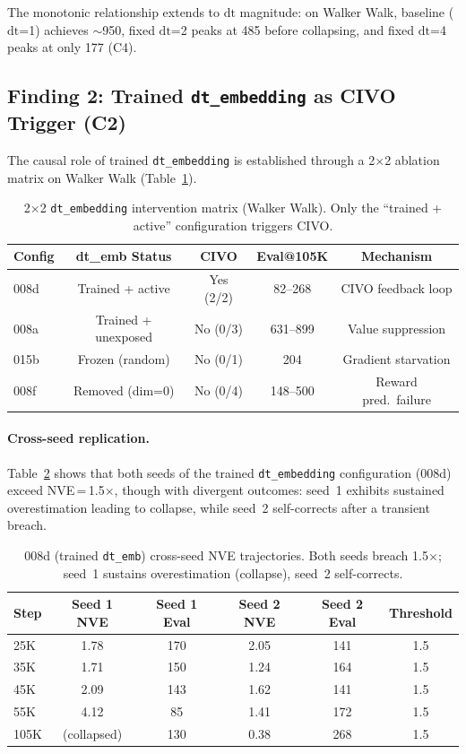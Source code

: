 \documentclass{article}
\newcommand{\dt}{\mathrm{dt}}
\begin{document}
The monotonic relationship extends to $\dt$ magnitude: on Walker Walk, baseline ($\dt$=1) achieves $\sim$950, fixed $\dt$=2 peaks at 485 before collapsing, and fixed $\dt$=4 peaks at only 177 (C4).

\subsection{Finding 2: Trained \texttt{dt\_embedding} as CIVO Trigger (C2)}
\label{sec:c2}

The causal role of trained \texttt{dt\_embedding} is established through a 2$\times$2 ablation matrix on Walker Walk (Table~\ref{tab:ablation-matrix}).

\begin{table}[h]
\centering
\caption{2$\times$2 \texttt{dt\_embedding} intervention matrix (Walker Walk).
Only the ``trained + active'' configuration triggers CIVO.}
\label{tab:ablation-matrix}
\begin{tabular}{lcccc}
\toprule
\textbf{Config} & \textbf{dt\_emb Status} & \textbf{CIVO} & \textbf{Eval@105K} & \textbf{Mechanism} \\
\midrule
008d & Trained + active & Yes (2/2) & 82--268 & CIVO feedback loop \\
008a & Trained + unexposed & No (0/3) & 631--899 & Value suppression \\
015b & Frozen (random) & No (0/1) & 204 & Gradient starvation \\
008f & Removed (dim=0) & No (0/4) & 148--500 & Reward pred.\ failure \\
\bottomrule
\end{tabular}
\end{table}

\paragraph{Cross-seed replication.}
Table~\ref{tab:008d-crossseed} shows that both seeds of the trained \texttt{dt\_embedding} configuration (008d) exceed NVE\,=\,1.5$\times$, though with divergent outcomes: seed~1 exhibits sustained overestimation leading to collapse, while seed~2 self-corrects after a transient breach.

\begin{table}[h]
\centering
\caption{008d (trained \texttt{dt\_emb}) cross-seed NVE trajectories.
Both seeds breach 1.5$\times$; seed~1 sustains overestimation (collapse), seed~2 self-corrects.}
\label{tab:008d-crossseed}
\begin{tabular}{lccccc}
\toprule
\textbf{Step} & \textbf{Seed 1 NVE} & \textbf{Seed 1 Eval} & \textbf{Seed 2 NVE} & \textbf{Seed 2 Eval} & \textbf{Threshold} \\
\midrule
25K & 1.78 & 170 & 2.05 & 141 & 1.5 \\
35K & 1.71 & 150 & 1.24 & 164 & 1.5 \\
45K & 2.09 & 143 & 1.62 & 141 & 1.5 \\
55K & 4.12 & 85 & 1.41 & 172 & 1.5 \\
105K & (collapsed) & 130 & 0.38 & 268 & 1.5 \\
\bottomrule
\end{tabular}
\end{table}
\end{document}
